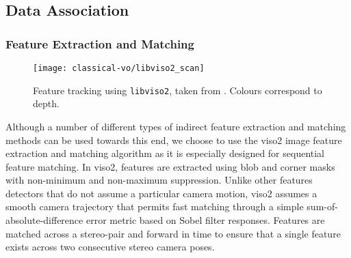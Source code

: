 \subsection{Data Association}
\label{sec:vo_data_extraction}
\subsubsection{Feature Extraction and Matching}
 
\begin{figure}[h!]
\begin{center}
		\texttt{[image: classical-vo/libviso2\_scan]}
		\caption{Feature tracking using \texttt{libviso2}, taken from \cite{Geiger2011-xe}. Colours correspond to depth.}
  	\label{fig:vo_feature_tracking}
\end{center}
\end{figure}
Although a number of different types of indirect feature extraction and matching methods can be used towards this end, we choose to use the \textsf{viso2} \citep{Geiger2011-xe} image feature extraction and matching algorithm as it is especially designed for sequential feature matching. In \textsf{viso2}, features are extracted using blob and corner masks with non-minimum and non-maximum suppression. Unlike other features detectors that do not assume a particular camera motion, \textsf{viso2} assumes a smooth camera trajectory that permits fast matching through a simple sum-of-absolute-difference error metric based on Sobel filter responses. Features are matched across a stereo-pair and forward in time to ensure that a single feature exists across two consecutive stereo camera poses. 

